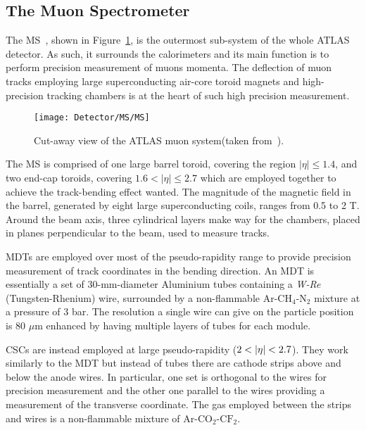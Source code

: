 		\subsection{The Muon Spectrometer}
		\label{sec:MuSpec}

			The \ac{MS}~\cite{MSTDR}, shown in Figure~\ref{fig:MS}, is the outermost sub-system of the whole \ac{ATLAS} detector. As such, it surrounds the calorimeters and its main function is to perform precision measurement of muons momenta. The deflection of muon tracks employing large superconducting air-core toroid magnets and high-precision tracking chambers is at the heart of such high precision measurement. 

			\begin{figure}[!htb]
				\centering
				\texttt{[image: Detector/MS/MS]}
				\caption{Cut-away view of the \ac{ATLAS} muon system(taken from~\cite{ATLASJINST}).}
				\label{fig:MS}
			\end{figure}

			The \ac{MS} is comprised of one large barrel toroid, covering the region $\left| \eta \right | \leq 1.4$, and two end-cap toroids, covering $1.6 < \left| \eta \right| \leq 2.7$ which are employed together to achieve the track-bending effect wanted. The magnitude of the magnetic field in the barrel, generated by eight large superconducting coils, ranges from 0.5 to 2 T. Around the beam axis, three cylindrical layers make way for the chambers, placed in planes perpendicular to the beam, used to measure tracks. 

			\acp{MDT} are employed over most of the pseudo-rapidity range to provide precision measurement of track coordinates in the bending direction. An MDT is essentially a set of 30-mm-diameter Aluminium tubes containing a \emph{W-Re} (Tungsten-Rhenium) wire, surrounded by a non-flammable $\mathrm{Ar}$-$\mathrm{CH_4}$-$\mathrm{N_2}$ mixture at a pressure of 3 bar. The resolution a single wire can give on the particle position is 80 $\mu$m enhanced by having multiple layers of tubes for each module.
			
			\acp{CSC} are instead employed at large pseudo-rapidity ($2 < |\eta| < 2.7$). They work similarly to the MDT but instead of tubes there are cathode strips above and below the anode wires. In particular, one set is orthogonal to the wires for precision measurement and the other one parallel to the wires providing a measurement of the transverse coordinate. The gas employed between the strips and wires is a non-flammable mixture of $\mathrm{Ar}$-$\mathrm{CO_2}$-$\mathrm{CF_2}$.

